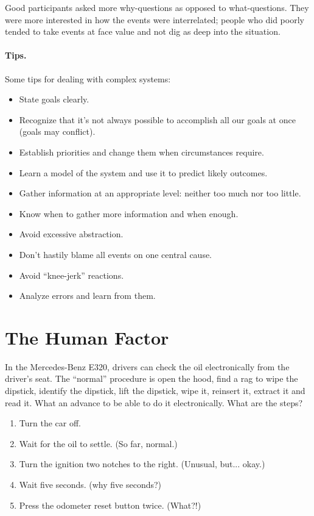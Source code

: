 Good participants asked more why-questions as opposed to what-questions. They were more interested in how the events were interrelated; people who did poorly tended to take events at face value and not dig as deep into the situation.


\paragraph{Tips.}
 Some tips for dealing with complex systems:

\begin{itemize}
	\item State goals clearly.
	\item Recognize that it's not always possible to accomplish all our goals at once (goals may conflict).
	\item Establish priorities and change them when circumstances require.
	\item Learn a model of the system and use it to predict likely outcomes.
	\item Gather information at an appropriate level: neither too much nor too little.
	\item Know when to gather more information and when enough. 
	\item Avoid excessive abstraction.
	\item Don't hastily blame all events on one central cause.
	\item Avoid ``knee-jerk'' reactions.
	\item Analyze errors and learn from them.

\end{itemize}

\section*{The Human Factor}
In the Mercedes-Benz E320, drivers can check the oil electronically from the driver's seat. The ``normal'' procedure is open the hood, find a rag to wipe the dipstick, identify the dipstick, lift the dipstick, wipe it, reinsert it, extract it and read it. What an advance to be able to do it electronically. What are the steps?

\begin{enumerate}
	\item Turn the car off.
	\item Wait for the oil to settle. (So far, normal.)
	\item Turn the ignition two notches to the right. (Unusual, but... okay.)
	\item Wait five seconds. (why five seconds?)
	\item Press the odometer reset button twice. (What?!)
\end{enumerate}

